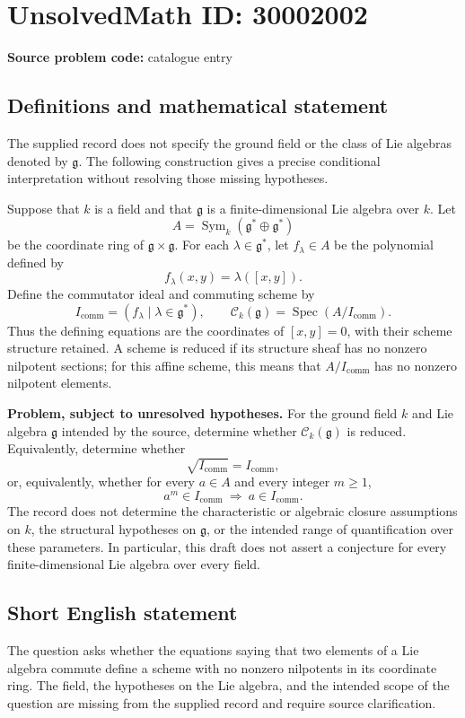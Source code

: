 \documentclass[11pt]{article}
\begin{document}
\section*{UnsolvedMath ID: 30002002}
\textbf{Source problem code:} catalogue entry
\subsection{Definitions and mathematical statement}
The supplied record does not specify the ground field or the class of Lie algebras denoted by $\mathfrak g$. The following construction gives a precise conditional interpretation without resolving those missing hypotheses.

Suppose that $k$ is a field and that $\mathfrak g$ is a finite-dimensional Lie algebra over $k$. Let
\[
A=\operatorname{Sym}_k(\mathfrak g^*\oplus\mathfrak g^*)
\]
be the coordinate ring of $\mathfrak g\times\mathfrak g$. For each $\lambda\in\mathfrak g^*$, let $f_\lambda\in A$ be the polynomial defined by
\[
f_\lambda(x,y)=\lambda([x,y]).
\]
Define the commutator ideal and commuting scheme by
\[
I_{\mathrm{comm}}=(f_\lambda\mid\lambda\in\mathfrak g^*),
\qquad
\mathcal C_k(\mathfrak g)=\operatorname{Spec}(A/I_{\mathrm{comm}}).
\]
Thus the defining equations are the coordinates of $[x,y]=0$, with their scheme structure retained. A scheme is reduced if its structure sheaf has no nonzero nilpotent sections; for this affine scheme, this means that $A/I_{\mathrm{comm}}$ has no nonzero nilpotent elements.

\textbf{Problem, subject to unresolved hypotheses.} For the ground field $k$ and Lie algebra $\mathfrak g$ intended by the source, determine whether $\mathcal C_k(\mathfrak g)$ is reduced. Equivalently, determine whether
\[
\sqrt{I_{\mathrm{comm}}}=I_{\mathrm{comm}},
\]
or, equivalently, whether for every $a\in A$ and every integer $m\geq 1$,
\[
a^m\in I_{\mathrm{comm}}\ \Longrightarrow\ a\in I_{\mathrm{comm}}.
\]
The record does not determine the characteristic or algebraic closure assumptions on $k$, the structural hypotheses on $\mathfrak g$, or the intended range of quantification over these parameters. In particular, this draft does not assert a conjecture for every finite-dimensional Lie algebra over every field.
\subsection{Short English statement}
The question asks whether the equations saying that two elements of a Lie algebra commute define a scheme with no nonzero nilpotents in its coordinate ring. The field, the hypotheses on the Lie algebra, and the intended scope of the question are missing from the supplied record and require source clarification.
\end{document}
